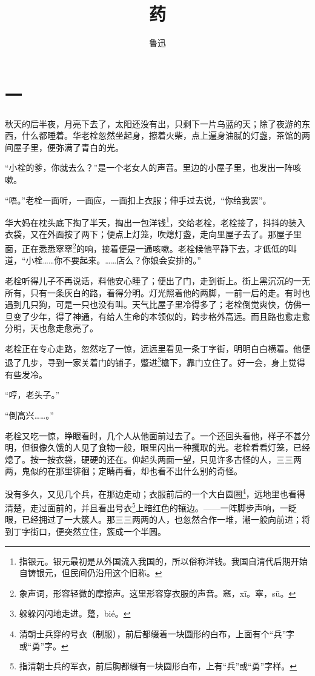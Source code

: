 \documentclass[12pt,UTF8]{ctexbook}
\title{\heiti\zihao{0} 药}
\author{鲁迅}
\date{}
\begin{document}
\maketitle
\tableofcontents

\chapter{一}

秋天的后半夜，月亮下去了，太阳还没有出，只剩下一片乌蓝的天；除了夜游的东西，什么都睡着。华老栓忽然坐起身，擦着火柴，点上遍身油腻的灯盏，茶馆的两间屋子里，便弥满了青白的光。

“小栓的爹，你就去么？”是一个老女人的声音。里边的小屋子里，也发出一阵咳嗽。

“唔。”老栓一面听，一面应，一面扣上衣服；伸手过去说，“你给我罢”。

华大妈在枕头底下掏了半天，掏出一包洋钱\footnote{指银元。银元最初是从外国流入我国的，所以俗称洋钱。我国自清代后期开始自铸银元，但民间仍沿用这个旧称。}，交给老栓，老栓接了，抖抖的装入衣袋，又在外面按了两下；便点上灯笼，吹熄灯盏，走向里屋子去了。那屋子里面，正在悉悉窣窣\footnote{象声词，形容轻微的摩擦声。这里形容穿衣服的声音。窸，xī。窣，sū。}的响，接着便是一通咳嗽。老栓候他平静下去，才低低的叫道，“小栓……你不要起来。……店么？你娘会安排的。”

老栓听得儿子不再说话，料他安心睡了；便出了门，走到街上。街上黑沉沉的一无所有，只有一条灰白的路，看得分明。灯光照着他的两脚，一前一后的走。有时也遇到几只狗，可是一只也没有叫。天气比屋子里冷得多了；老栓倒觉爽快，仿佛一旦变了少年，得了神通，有给人生命的本领似的，跨步格外高远。而且路也愈走愈分明，天也愈走愈亮了。

老栓正在专心走路，忽然吃了一惊，远远里看见一条丁字街，明明白白横着。他便退了几步，寻到一家关着门的铺子，蹩进\footnote{躲躲闪闪地走进。蹩，bié。}檐下，靠门立住了。好一会，身上觉得有些发冷。

“哼，老头子。”

“倒高兴……。”

老栓又吃一惊，睁眼看时，几个人从他面前过去了。一个还回头看他，样子不甚分明，但很像久饿的人见了食物一般，眼里闪出一种攫取的光。老栓看看灯笼，已经熄了。按一按衣袋，硬硬的还在。仰起头两面一望，只见许多古怪的人，三三两两，鬼似的在那里徘徊；定睛再看，却也看不出什么别的奇怪。

没有多久，又见几个兵，在那边走动；衣服前后的一个大白圆圈\footnote{清朝士兵穿的号衣（制服），前后都缀着一块圆形的白布，上面有个“兵”字或“勇”字。}，远地里也看得清楚，走过面前的，并且看出号衣\footnote{指清朝士兵的军衣，前后胸都缀有一块圆形白布，上有“兵”或“勇”字样。}上暗红色的镶边。——一阵脚步声响，一眨眼，已经拥过了一大簇人。那三三两两的人，也忽然合作一堆，潮一般向前进；将到丁字街口，便突然立住，簇成一个半圆。
\end{document}

